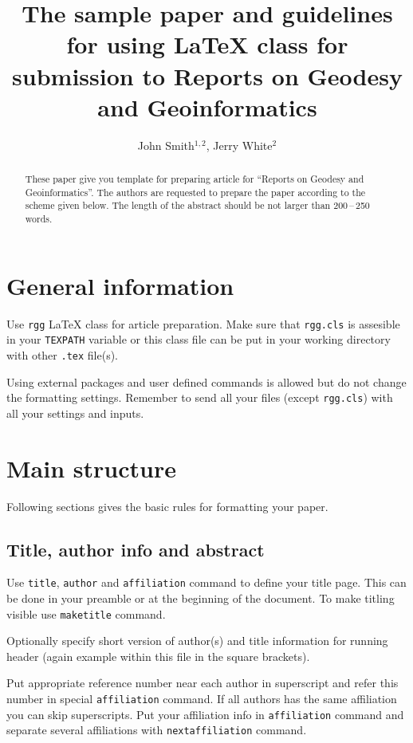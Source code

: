\documentclass{rgg}
\title[The sample paper\ldots]{%
  The sample paper and guidelines for using \LaTeX{} class for submission to 
  Reports on Geodesy and Geoinformatics}
\author[Smith, J., White, J.]{John Smith$^{1,2}$, Jerry White$^2$}
\affiliation{%
  $^1$Department of Very Important Issues,\\
  Faculty of Even More Important Issues,\\
  Awesome University
  \nextaffiliation
  $^2$Department of Geodesy Affairs,\\
  Institute of Geodesy and Geoinformatcis
}
\begin{document}
    \maketitle

    \begin{abstract}
      These paper give you template for preparing article for ``Reports on 
      Geodesy and Geoinformatics''. The authors are requested to prepare the 
      paper according to the scheme given below. The length of the abstract 
      should be not larger than 200\,–\,250 words.
    \end{abstract}

  \section{General information}
    Use \texttt{rgg} \LaTeX{} class for article preparation.
    Make sure that \texttt{rgg.cls} is assesible in your
    \texttt{TEXPATH} variable or this class file can be put
    in your working directory with other \texttt{.tex} file(s).

    Using external packages and user defined commands is allowed
    but do not change the formatting settings.
    Remember to send all your files (except \texttt{rgg.cls}) 
    with all your settings and inputs.

  \section{Main structure}
    \label{labelforsection}

    Following sections gives the basic rules for formatting your
    paper.

  \subsection{Title, author info and abstract}
    Use \texttt{title}, \texttt{author} 
    and \texttt{affiliation} command
    to define your title page. This can be done
    in your preamble or at the beginning of the document.
    To make titling visible use \texttt{maketitle} command.

    Optionally specify short version of author(s) and title information
    for running header (again example within this file in the square brackets).

    Put appropriate reference number near each author in superscript
    and refer this number in special \texttt{affiliation} command.
    If all authors has the same affiliation you can skip superscripts.
    Put your affiliation info in \texttt{affiliation} command
    and separate several affiliations with \texttt{nextaffiliation} command.
\end{document}

